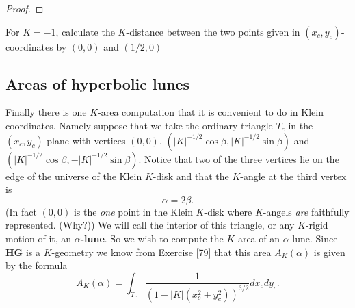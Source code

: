 \documentclass{ximera}
\begin{document}
\begin{proof}
\end{proof}

\begin{exercise}
For $K=-1$, calculate the $K$-distance between the two points given in
$\left(  x_{c},y_{c}\right)  $-coordinates by $\left(  0,0\right)  $ and
$\left(  1/2,0\right)  $
\end{exercise}

\subsection*{Areas of hyperbolic lunes}

Finally there is one $K$-area computation that it is convenient to do in Klein
coordinates. Namely suppose that we take the ordinary triangle $T_{c}$ in the
$\left(  x_{c},y_{c}\right)  $-plane with vertices $\left(  0,0\right)  $,
$\left(  \left\vert K\right\vert ^{-1/2}\cos \beta,\left\vert
K\right\vert ^{-1/2}\sin \beta\right)  $ and $\left(  \left\vert
K\right\vert ^{-1/2}\cos \beta,-\left\vert K\right\vert ^{-1/2}%
\sin \beta\right)  $. Notice that two of the three vertices lie on the
edge of the universe of the Klein $K$-disk and that the $K$-angle at the third
vertex is%
\[
\alpha=2\beta.
\]
(In fact $\left(  0,0\right)  $ is the \textit{one} point in the Klein
$K$-disk where $K$-angels \textit{are} faithfully represented. (Why?)) We will
call the interior of this triangle, or any $K$-rigid motion of it, an $\alpha
$\textbf{-lune}. So we wish to compute the $K$-area of an $\alpha$-lune. Since
\textbf{HG} is a $K$-geometry we know from Exercise \ref{79} that this area
$A_{K}\left(  \alpha\right)  $ is given by the formula%
\[
A_{K}\left(  \alpha\right)  =%
{\displaystyle\int\nolimits_{T_{c}}}
\frac{1}{\left(  1-\left\vert K\right\vert \left(  x_{c}^{2}+y_{c}^{2}\right)
\right)  ^{3/2}}dx_{c}dy_{c}.
\]
\end{document}
